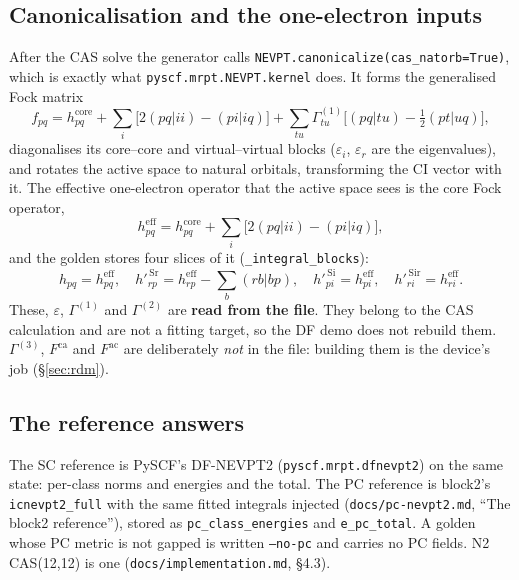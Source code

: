 \documentclass[11pt]{article}
\newcommand{\code}[1]{\texttt{#1}}
\newcommand{\G}[1]{\Gamma^{(#1)}}
\newcommand{\eps}{\varepsilon}
\newcommand{\Fca}{F^{\mathrm{ca}}}
\newcommand{\Fac}{F^{\mathrm{ac}}}
\newcommand{\cls}[1]{\ensuremath{\mathrm{#1}}}
\begin{document}
\subsection{Canonicalisation and the one-electron inputs}
\label{sec:canon}
After the CAS solve the generator calls
\code{NEVPT.canonicalize(cas\_natorb=True)}, which is exactly what
\code{pyscf.mrpt.NEVPT.kernel} does. It forms the generalised Fock matrix
\begin{equation}
  f_{pq} = h^{\mathrm{core}}_{pq}
     + \sum_i \bigl[2(pq|ii) - (pi|iq)\bigr]
     + \sum_{tu} \G1_{tu}\bigl[(pq|tu) - \tfrac12(pt|uq)\bigr],
  \label{eq:gfock}
\end{equation}
diagonalises its core--core and virtual--virtual blocks ($\eps_i$, $\eps_r$
are the eigenvalues), and rotates the active space to natural orbitals,
transforming the CI vector with it. The effective one-electron operator that
the active space sees is the core Fock operator,
\begin{equation}
  h^{\mathrm{eff}}_{pq} = h^{\mathrm{core}}_{pq}
     + \sum_i \bigl[2(pq|ii) - (pi|iq)\bigr],
  \label{eq:h1eff}
\end{equation}
and the golden stores four slices of it (\code{\_integral\_blocks}):
\begin{equation}
  h_{pq} = h^{\mathrm{eff}}_{pq},\quad
  h'^{\,\cls{Sr}}_{rp} = h^{\mathrm{eff}}_{rp} - \sum_b (rb|bp),\quad
  h'^{\,\cls{Si}}_{pi} = h^{\mathrm{eff}}_{pi},\quad
  h'^{\,\cls{Sir}}_{ri} = h^{\mathrm{eff}}_{ri}.
  \label{eq:h1slices}
\end{equation}
These, $\eps$, $\G1$ and $\G2$ are \textbf{read from the file}. They belong to
the CAS calculation and are not a fitting target, so the DF demo does not
rebuild them. $\G3$, $\Fca$ and $\Fac$ are deliberately \emph{not} in the
file: building them is the device's job (\S\ref{sec:rdm}).

\subsection{The reference answers}
The SC reference is PySCF's DF-NEVPT2 (\code{pyscf.mrpt.dfnevpt2}) on the
same state: per-class norms and energies and the total. The PC reference is
block2's \code{icnevpt2\_full} with the same fitted integrals injected
(\code{docs/pc-nevpt2.md}, ``The block2 reference''), stored as
\code{pc\_class\_energies} and \code{e\_pc\_total}. A golden whose PC metric is
not gapped is written \code{--no-pc} and carries no PC fields. N2 CAS(12,12) is
one (\code{docs/implementation.md}, \S4.3).
\end{document}
